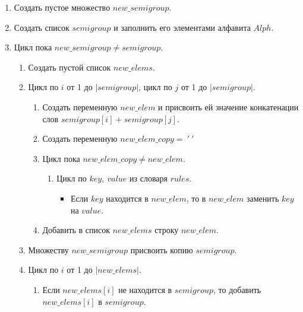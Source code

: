 \documentclass[bachelor, och, labwork]{shiza}
\begin{document}
\begin{enumerate}
   \item Создать пустое множество $new\_semigroup$.
   \item Создать список $semigroup$ и заполнить его элементами алфавита $Alph$.
   \item Цикл пока $new\_semigroup \not = semigroup$.
        \begin{enumerate}
            \item Создать пустой список $new\_elems$.
            \item Цикл по $i$ от 1 до $|semigroup|$, цикл по $j$ от 1 до $|semigroup|$.
                \begin{enumerate}
                    \item Создать переменную $new\_elem$ и присвоить ей значение конкатенации
                    слов $semigroup[i] + semigroup[j]$.
                    \item Создать переменную $new\_elem\_copy = ~'~'$
                    \item Цикл пока $new\_elem\_copy \not = new\_elem$.
                        \begin{enumerate}
                            \item Цикл по $key,~value$ из словаря $rules$.
                                \begin{itemize}
                                    \item Если $key$ находится в $new\_elem$, то 
                                    в $new\_elem$ заменить $key$ на $value$. 
                                \end{itemize}
                        \end{enumerate}
                    \item Добавить в список $new\_elems$ строку $new\_elem$.
                \end{enumerate}
            \item Множеству $new\_semigroup$ присвоить копию $semigroup$.
            \item Цикл по $i$ от 1 до $|new\_elems|$.
                \begin{enumerate}
                    \item Если $new\_elems[i]$ не находится в $semigroup$, то
                    добавить \\$new\_elems[i]$ в $semigroup$.
                \end{enumerate}
        \end{enumerate}

\end{enumerate}
\end{document}
